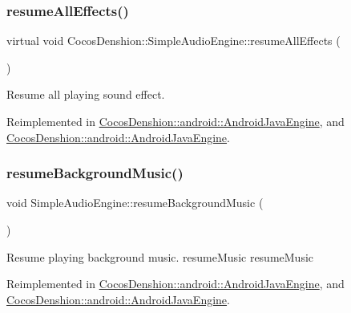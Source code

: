 \subsubsection{\texorpdfstring{resume\+All\+Effects()}{resumeAllEffects()}\hspace{0.1cm}{\footnotesize\ttfamily [2/2]}}
{\footnotesize\ttfamily virtual void Cocos\+Denshion\+::\+Simple\+Audio\+Engine\+::resume\+All\+Effects (\begin{DoxyParamCaption}{ }\end{DoxyParamCaption})\hspace{0.3cm}{\ttfamily [virtual]}}

Resume all playing sound effect. 

Reimplemented in \hyperlink{classCocosDenshion_1_1android_1_1AndroidJavaEngine_a168aac306a10c8c272636cdd1d816760}{Cocos\+Denshion\+::android\+::\+Android\+Java\+Engine}, and \hyperlink{classCocosDenshion_1_1android_1_1AndroidJavaEngine_a52558e48db6fb0dd330d18c7f569aa85}{Cocos\+Denshion\+::android\+::\+Android\+Java\+Engine}.

\mbox{\label{classCocosDenshion_1_1SimpleAudioEngine_a565f2d3e28072b6a7173064b797767c0}} 
\subsubsection{\texorpdfstring{resume\+Background\+Music()}{resumeBackgroundMusic()}\hspace{0.1cm}{\footnotesize\ttfamily [1/2]}}
{\footnotesize\ttfamily void Simple\+Audio\+Engine\+::resume\+Background\+Music (\begin{DoxyParamCaption}{ }\end{DoxyParamCaption})\hspace{0.3cm}{\ttfamily [virtual]}}

Resume playing background music.  resume\+Music  resume\+Music 

Reimplemented in \hyperlink{classCocosDenshion_1_1android_1_1AndroidJavaEngine_aa0bd22b0d6bafc1c6db7c57da0688d80}{Cocos\+Denshion\+::android\+::\+Android\+Java\+Engine}, and \hyperlink{classCocosDenshion_1_1android_1_1AndroidJavaEngine_aad61da9bf83bd3f16fbef06cbbb04b38}{Cocos\+Denshion\+::android\+::\+Android\+Java\+Engine}.

